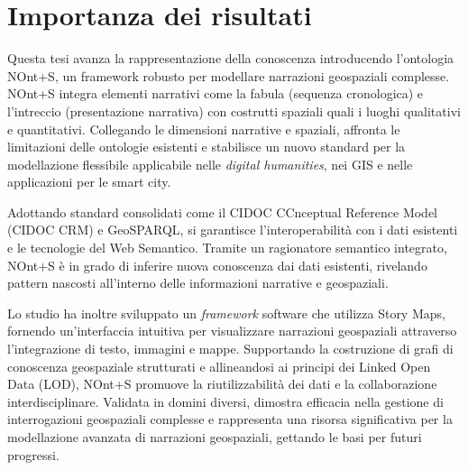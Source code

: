 \section*{Importanza dei risultati}

Questa tesi avanza la rappresentazione della conoscenza introducendo l'ontologia NOnt+S, un framework robusto per modellare narrazioni geospaziali complesse. NOnt+S integra elementi narrativi come la fabula (sequenza cronologica) e l'intreccio (presentazione narrativa) con costrutti spaziali quali i luoghi qualitativi e quantitativi. Collegando le dimensioni narrative e spaziali, affronta le limitazioni delle ontologie esistenti e stabilisce un nuovo standard per la modellazione flessibile applicabile nelle \textit{digital humanities}, nei GIS e nelle applicazioni per le smart city.

Adottando standard consolidati come il CIDOC CCnceptual Reference Model (CIDOC CRM) e GeoSPARQL, si garantisce l'interoperabilità con i dati esistenti e le tecnologie del Web Semantico. Tramite un ragionatore semantico integrato, NOnt+S è in grado di inferire nuova conoscenza dai dati esistenti, rivelando pattern nascosti all'interno delle informazioni narrative e geospaziali.

Lo studio ha inoltre sviluppato un \textit{framework} software che utilizza Story Maps, fornendo un'interfaccia intuitiva per visualizzare narrazioni geospaziali attraverso l'integrazione di testo, immagini e mappe. Supportando la costruzione di grafi di conoscenza geospaziale strutturati e allineandosi ai principi dei Linked Open Data (LOD), NOnt+S promuove la riutilizzabilità dei dati e la collaborazione interdisciplinare. Validata in domini diversi, dimostra efficacia nella gestione di interrogazioni geospaziali complesse e rappresenta una risorsa significativa per la modellazione avanzata di narrazioni geospaziali, gettando le basi per futuri progressi.